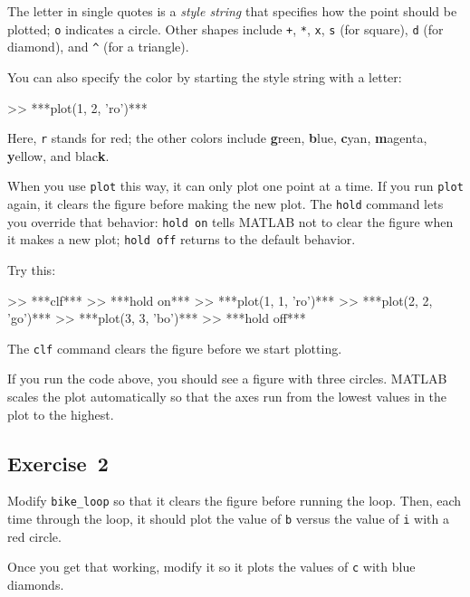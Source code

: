 
The letter in single quotes is a \emph{style string} that specifies how the
point should be plotted;  \lstinline{o} indicates a circle.
Other shapes include \lstinline{+},
\lstinline{*},
\lstinline{x},
\lstinline{s} (for square),
\lstinline{d} (for diamond), and
\lstinline{^} (for a triangle).

You can also specify the color by starting the style string with a letter:

\begin{code}
>> ***plot(1, 2, 'ro')***
\end{code}

Here, \lstinline{r} stands for red; the other colors include {\bf g}reen, {\bf
b}lue, {\bf c}yan, {\bf m}agenta, {\bf y}ellow, and blac{\bf k}.

When you use \lstinline{plot} this way, it can only plot one point at a
time.  If you run \lstinline{plot} again, it clears the figure before making
the new plot.  The \lstinline{hold} command lets you override that behavior:
\lstinline{hold on} tells MATLAB not to clear the figure when it makes a new
plot; \lstinline{hold off} returns to the default behavior.


Try this:

\begin{code}
>> ***clf***
>> ***hold on***
>> ***plot(1, 1, 'ro')***
>> ***plot(2, 2, 'go')***
>> ***plot(3, 3, 'bo')***
>> ***hold off***
\end{code}

The \lstinline{clf} command clears the figure before we start plotting.


If you run the code above, you should see a figure with three circles.  MATLAB scales the plot automatically so that the axes run from the lowest values in the plot to the highest.

\subsection{Exercise~2}
Modify \lstinline{bike_loop} so that it clears the figure before running the loop.  Then, each time through the loop, it should plot the value of \lstinline{b} versus the value of \lstinline{i} with a red circle.

Once you get that working, modify it so it plots the values of \lstinline{c} with blue diamonds.


